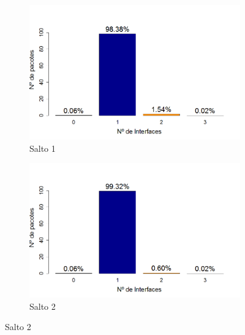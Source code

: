 \documentclass[
	12pt,				%
	openright,			%
	oneside,
	a4paper,			%
	english,			%
	french,				%
	spanish,			%
	brazil				%
	]{abntex2}
\begin{document}
\begin{figure}[b!]
	\centering
	\caption{Ditribuição da recepção dos pacotes (Triangle)}
	\label{fig_dpr_opt}
	\begin{subfigure}{.5\textwidth}
		\centering
		\includegraphics[width=.98\linewidth]{DRP_OPT_Salto1}
		\captionsetup{width=.9\textwidth}
		\caption{Salto 1}
		\label{dpr_opt_s1}
	\end{subfigure}%
	\begin{subfigure}{.5\textwidth}
		\centering
		\includegraphics[width=.98\linewidth]{DRP_OPT_Salto2}
		\captionsetup{width=.9\textwidth}
		\caption{Salto 2}
		\label{dpr_opt_s2}
	\end{subfigure}
\end{figure}
\end{document}
